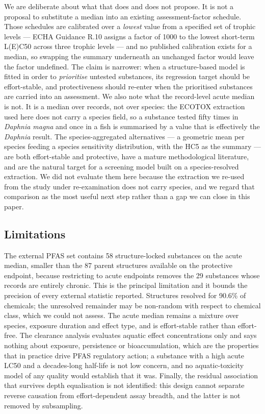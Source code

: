 \documentclass[preprint,12pt]{elsarticle}
\begin{document}
We are deliberate about what that does and does not propose. It is not a
proposal to substitute a median into an existing assessment-factor schedule.
Those schedules are calibrated over a \emph{lowest} value from a specified set
of trophic levels --- ECHA Guidance R.10 assigns a factor of 1000 to the lowest
short-term L(E)C50 across three trophic levels \cite{echa2008r10} --- and no published calibration
exists for a median, so swapping the summary underneath an unchanged factor
would leave the factor undefined. The claim is narrower: when a structure-based
model is fitted in order to \emph{prioritise} untested substances, its
regression target should be effort-stable, and protectiveness should re-enter
when the prioritised substances are carried into an assessment. We also note
what the record-level acute median is not. It is a median over records, not
over species: the ECOTOX extraction used here does not carry a species field, so
a substance tested fifty times in \emph{Daphnia magna} and once in a fish is
summarised by a value that is effectively the \emph{Daphnia} result. The
species-aggregated alternatives --- a geometric mean per species feeding a
species sensitivity distribution, with the HC5 as the summary
\cite{posthuma2019ssd} --- are both
effort-stable and protective, have a mature methodological literature, and are
the natural target for a screening model built on a species-resolved
extraction. We did not evaluate them here because the extraction we re-used
from the study under re-examination does not carry species, and we regard that
comparison as the most useful next step rather than a gap we can close in this
paper.

\subsection{Limitations}

The external PFAS set contains 58 structure-locked substances on the acute
median, smaller than the 87 parent structures available on the protective
endpoint, because restricting to acute endpoints removes the 29 substances whose
records are entirely chronic. This is the
principal limitation and it bounds the precision of every external statistic
reported. Structures resolved for 90.6\% of chemicals; the unresolved remainder
may be non-random with respect to chemical class, which we could not assess.
The acute median remains a mixture over species, exposure duration and effect
type, and is effort-stable rather than effort-free. The clearance analysis
evaluates aquatic effect concentrations only and says nothing about exposure,
persistence or bioaccumulation, which are the properties that in practice drive
PFAS regulatory action; a substance with a high acute LC50 and a decades-long
half-life is not low concern, and no aquatic-toxicity model of any quality would
establish that it was. Finally, the residual association that survives depth
equalisation is not identified: this design cannot separate reverse causation
from effort-dependent assay breadth, and the latter is not removed by
subsampling.
\end{document}
